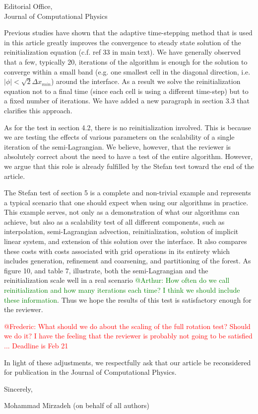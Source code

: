 \documentclass{scrlttr2}
\begin{document}
\begin{letter} {Editorial Office, \\ Journal of Computational
Physics}
\begin{itemize}
\begin{itemize}
Previous studies have shown that the adaptive time-stepping method that is used
in this article greatly improves the convergence to steady state solution of
the reinitialization equation (c.f. ref 33 in main text). We have generally
observed that a few, typically 20, iterations of the algorithm is enough for
the solution to converge within a small band (e.g. one smallest cell in the
diagonal direction, i.e. $|\phi| < \sqrt{2}\Delta x_{min}$) around the
interface. As a result we solve the reinitialization equation not to a final
time (since each cell is using a different time-step) but to a fixed number of
iterations. We have added a new paragraph in section 3.3 that clarifies this
approach.

As for the test in section 4.2, there is no reinitialization involved. This is
because we are testing the effects of various parameters on the scalability of
a single iteration of the semi-Lagrangian. We believe, however, that the
reviewer is absolutely correct about the need to have a test of the entire
algorithm. However, we argue that this role is already fulfilled by the Stefan
test toward the end of the article. 

The Stefan test of section 5 is a complete and non-trivial example and
represents a typical scenario that one should expect when using our algorithms
in practice. This example serves, not only as a demonstration of what our
algorithms can achieve, but also as a scalability test of all different
components, such as interpolation, semi-Lagrangian advection, reinitialization,
solution of implicit linear system, and extension of this solution over the
interface. It also compares these costs with costs associated with grid
operations in its entirety which includes generation, refinement and
coarsening, and partitioning of the forest. As figure 10, and table 7,
illustrate, both the semi-Lagrangian and the reinitialization scale well in a
real scenario \textcolor{green}{@Arthur: How often do we call reinitialization
and how many iterations each time? I think we should include these
information}. Thus we hope the results of this test is satisfactory enough for
the reviewer.
\end{itemize} 
\end{itemize}

\textcolor{red}{@Frederic: What should we do about the scaling of the full
rotation test? Should we do it? I have the feeling that the reviewer is
probably not going to be satisfied ... Deadline is Feb 21}

In light of these adjustments, we respectfully ask that our article be
reconsidered for publication in the Journal of Computational Physics.
\closing{Sincerely,} 
Mohammad Mirzadeh (on behalf of all authors) 
\end{letter}
\end{document}
